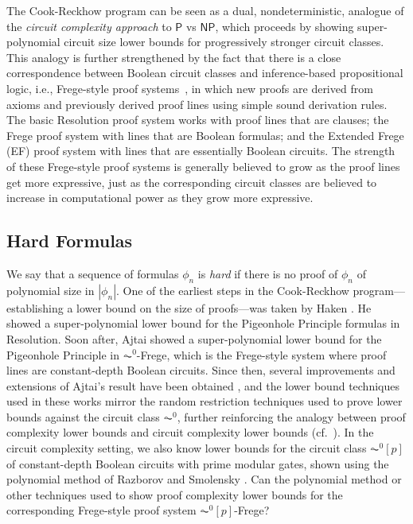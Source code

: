 \documentclass[11pt,letter]{article}
\theoremstyle{remark} %
\begin{document}
    The Cook-Reckhow program can be seen as a dual, nondeterministic, analogue of the {\it circuit complexity approach} to $\mathsf{P}$ vs $\mathsf{NP}$, which proceeds by showing super-polynomial circuit size lower bounds for progressively stronger circuit classes. This analogy is further strengthened by the fact that there is a close correspondence between Boolean circuit classes and inference-based propositional logic, i.e., Frege-style proof systems~\cite{BP98}, in which new proofs are derived from axioms and previously derived proof lines using simple sound derivation rules. The basic  Resolution proof system works with proof lines that are clauses; the Frege proof system with lines that are Boolean formulas; and the Extended Frege (EF) proof system with lines that are essentially Boolean circuits. The strength of these Frege-style proof systems is generally believed to grow as the proof lines get more expressive, just as the corresponding circuit classes are believed to increase in computational power as they grow more expressive.

\subsection{Hard Formulas}

We say that a sequence of formulas $\phi_n$ is \emph{hard} if there is no proof of $\phi_n$ of polynomial size in $|\phi_n|$. One of the earliest steps in the Cook-Reckhow program---establishing a lower bound on the size of proofs---was taken by Haken \cite{Hak85}. He showed a super-polynomial lower bound for the Pigeonhole Principle formulas in Resolution. Soon after, Ajtai \cite{Ajt88} showed a super-polynomial lower bound for the Pigeonhole Principle in $\AC^0$-Frege, which is the Frege-style system where proof lines are constant-depth Boolean circuits. Since then,  several improvements and extensions of Ajtai's result have been obtained  \cite{Ajt94, BeameIKPP96, BussIKPRS96}, and the lower bound techniques used in these works mirror the random restriction techniques used to prove lower bounds against the circuit class $\AC^0$, further reinforcing the analogy between proof complexity lower bounds and circuit complexity lower bounds (cf.~\cite{PBI93,KPW95}). In the circuit complexity setting, we also know lower bounds for the circuit class $\AC^0[p]$ of constant-depth Boolean circuits with prime modular gates, shown using the polynomial method of Razborov and Smolensky  \cite{Razborov87-eng,Smolensky87}. Can the polynomial method or other techniques used to show proof complexity lower bounds for the corresponding Frege-style proof system $\AC^0[p]$-Frege?
\end{document}
